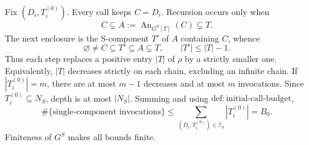 Fix \((D_i,T_i^{(0)})\). Every call keeps \(C=D_i\). Recursion occurs only when
\[
 C\subsetneq A:=\operatorname{An}_{G^S[T]}(C)\subsetneq T.
\]
The next enclosure is the S-component \(T'\) of \(A\) containing \(C\), whence
\[
 \varnothing\ne C\subseteq T'\subseteq A\subsetneq T,\qquad |T'|\le|T|-1.
\]
Thus each step replaces a positive entry \(|T|\) of \(\rho\) by a strictly smaller one. Equivalently, \(|T|\) decreases strictly on each chain, excluding an infinite chain. If \(|T_i^{(0)}|=m\), there are at most \(m-1\) decreases and at most \(m\) invocations. Since \(T_i^{(0)}\subseteq N_S\), depth is at most \(|N_S|\). Summing and using \(\mathrm{def:initial\text{-}call\text{-}budget}\),
\[
 \#\{\text{single-component invocations}\}
 \le\sum_{(D_i,T_i^{(0)})\in\mathcal I_0}|T_i^{(0)}|=B_0.
\]
Finiteness of \(G^S\) makes all bounds finite.